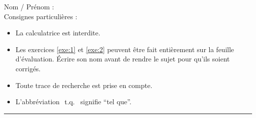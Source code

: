 


\pagestyle{fancy}
\fancyhead[R]{\today}

\reversemarginpar

\null\vspace{-30pt}
Nom / Prénom : \\

Consignes particulières : 
\begin{itemize}[label=$\bullet$]
	\item 
	La calculatrice est {interdite}.
	\item 
	Les exercices \ref{exe:1} et \ref{exe:2} peuvent être fait entièrement sur la feuille d'évaluation. Écrire son nom avant de rendre le sujet pour qu'ils soient corrigés.
	\item 
	Toute trace de recherche est prise en compte.
	\item 
	L'abbréviation $\text{ t.q. }$ signifie ``tel que''.
\end{itemize}

\hrule


